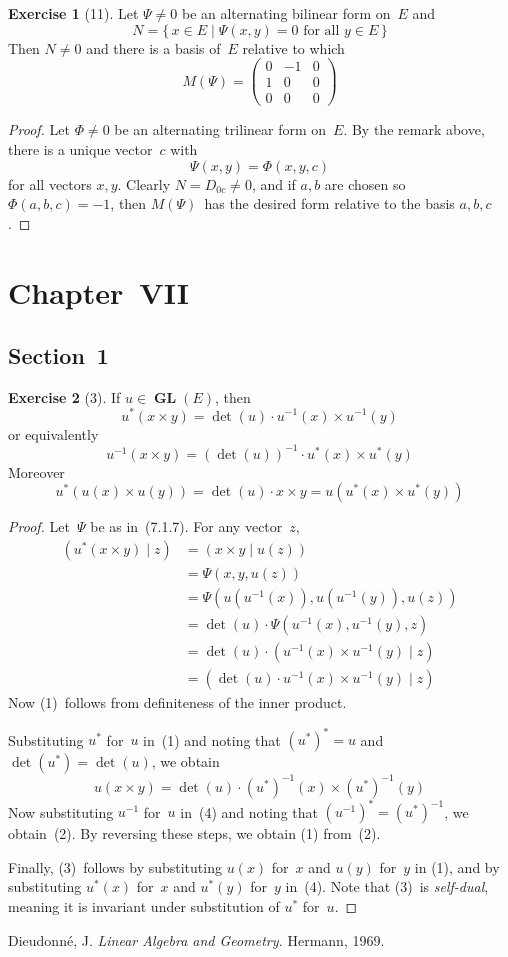\documentclass[letterpaper,12pt]{article}
\newcommand{\mult}{\cdot}
\newcommand{\cross}{\times}
\DeclareMathOperator{\GL}{\mathbf{GL}}
\newcommand{\inv}[1]{#1^{-1}}
\newcommand{\innerprod}[2]{({#1}\;|\;{#2})}
\newcommand{\adj}[1]{#1^*}
\theoremstyle{definition}
\newtheorem*{exer}{Exercise}
\theoremstyle{remark}
\begin{document}
\begin{exer}[11]
Let \(\Psi\ne0\) be an alternating bilinear form on~\(E\) and
\[N=\{\,x\in E\mid \Psi(x,y)=0\text{ for all }y\in E\,\}\]
Then \(N\ne 0\) and there is a basis of~\(E\) relative to which
\[M(\Psi)=\begin{pmatrix}
0&-1&0\\
1&0&0\\
0&0&0
\end{pmatrix}\]
\end{exer}
\begin{proof}
Let \(\Phi\ne0\) be an alternating trilinear form on~\(E\). By the remark above, there is a unique vector~\(c\) with
\[\Psi(x,y)=\Phi(x,y,c)\]
for all vectors \(x,y\). Clearly \(N=D_{0c}\ne0\), and if \(a,b\) are chosen so \(\Phi(a,b,c)=-1\), then \(M(\Psi)\)~has the desired form relative to the basis \(a,b,c\).
\end{proof}

\section*{Chapter~VII}
\subsection*{Section~1}
\begin{exer}[3]
If \(u\in\GL(E)\), then
\[\adj{u}(x\cross y)=\det(u)\mult\inv{u}(x)\cross\inv{u}(y)\tag{1}\]
or equivalently
\[\inv{u}(x\cross y)=(\det(u))^{-1}\mult\adj{u}(x)\cross\adj{u}(y)\tag{2}\]
Moreover
\[\adj{u}(u(x)\cross u(y))=\det(u)\mult x\cross y=u(\adj{u}(x)\cross\adj{u}(y))\tag{3}\]
\end{exer}
\begin{proof}
Let~\(\Psi\) be as in~(7.1.7). For any vector~\(z\),
\begin{align*}
\innerprod{\adj{u}(x\cross y)}{z}&=\innerprod{x\cross y}{u(z)}\\
	&=\Psi(x,y,u(z))\\
	&=\Psi(u(\inv{u}(x)),u(\inv{u}(y)),u(z))\\
	&=\det(u)\mult\Psi(\inv{u}(x),\inv{u}(y),z)\\
	&=\det(u)\mult\innerprod{\inv{u}(x)\cross\inv{u}(y)}{z}\\
	&=\innerprod{\det(u)\mult\inv{u}(x)\cross\inv{u}(y)}{z}
\end{align*}
Now (1)~follows from definiteness of the inner product.

Substituting \(\adj{u}\) for~\(u\) in~(1) and noting that \(\adj{(\adj{u})}=u\) and \(\det(\adj{u})=\det(u)\), we obtain
\[u(x\cross y)=\det(u)\mult\inv{(\adj{u})}(x)\cross\inv{(\adj{u})}(y)\tag{4}\]
Now substituting \(\inv{u}\) for~\(u\) in~(4) and noting that \(\adj{(\inv{u})}=\inv{(\adj{u})}\), we obtain~(2). By reversing these steps, we obtain (1) from~(2).

Finally, (3)~follows by substituting \(u(x)\) for~\(x\) and \(u(y)\) for~\(y\) in (1), and by substituting \(\adj{u}(x)\) for~\(x\) and \(\adj{u}(y)\) for~\(y\) in~(4). Note that (3)~is \emph{self-dual}, meaning it is invariant under substitution of \(\adj{u}\) for~\(u\).
\end{proof}

\begin{thebibliography}{0}
 Dieudonn\'e, J. \textit{Linear Algebra and Geometry.} Hermann, 1969.
\end{thebibliography}
\end{document}
